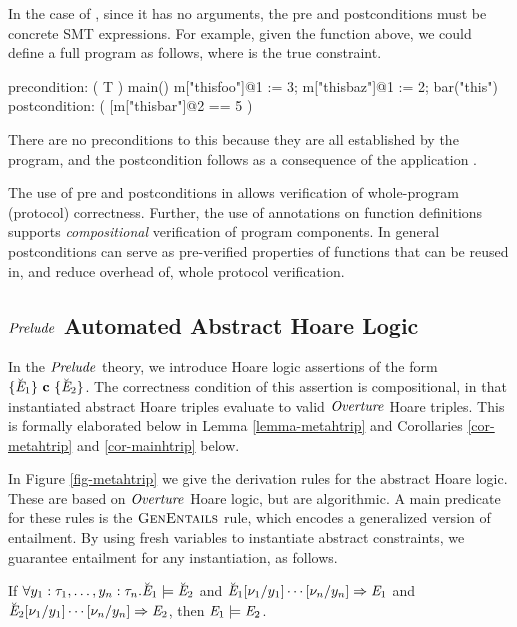 \peqfig

In the case of , since it has no arguments, the
pre and postconditions must be concrete SMT expressions.
For example, given the  function above, we
could define a full program as follows, where 
is the true constraint. 
\begin{verbatimtab}
precondition: ( T )
main(){
  m["thisfoo"]@1 := 3; m["thisbaz"]@1 := 2; bar("this")
}
postcondition: ( [m["thisbar"]@2 == 5 )
\end{verbatimtab}
There are no preconditions to this  because they are
all established by the program, and the postcondition follows
as a consequence of the application .

The use of pre and postconditions in  allows verification of
whole-program (protocol) correctness. Further, the use of annotations
on function definitions supports \emph{compositional} verification of
program components. In general postconditions can serve as
pre-verified properties of functions that can be reused in, and reduce
overhead of, whole protocol verification.

\subsection{$\mathit{Prelude}$ Automated Abstract Hoare Logic}
\label{section-metahtrip}

In the $\mathit{Prelude}$ theory, we introduce Hoare logic assertions
of the form $\{ \breve{\mathit{E}}_1 \}\ \mathbf{c}\ \{ \breve{\mathit{E}}_2 \}$. The correctness
condition of this assertion is compositional, in that instantiated
abstract Hoare triples evaluate to valid $\mathit{Overture}$ Hoare triples.
This is formally elaborated below in Lemma
\ref{lemma-metahtrip} and Corollaries \ref{cor-metahtrip} and
\ref{cor-mainhtrip} below.

In Figure \ref{fig-metahtrip} we give the derivation rules for the
abstract Hoare logic. These are based on $\mathit{Overture}$ Hoare logic, but
are algorithmic. A main predicate for these rules is the
$\text{\sc GenEntails}$ rule, which encodes a generalized version of
entailment. By using fresh variables to instantiate abstract
constraints, we guarantee entailment for any instantiation, as
follows.

\begin{lemma}
  \label{lemma-genentails}
  If $\forall y_1:\tau_1,\ldots,y_n:\tau_n . \breve{\mathit{E}}_1 \models \breve{\mathit{E}}_2$ and
  $\breve{\mathit{E}}_1[\nu_1/y_1]\cdots[\nu_n/y_n] \Rightarrow \mathit{E}_1$ and
  $\breve{\mathit{E}}_2[\nu_1/y_1]\cdots[\nu_n/y_n] \Rightarrow \mathit{E}_2$, then
  $\mathit{E}_1 \models \mathit{E}_2$.  
\end{lemma}

